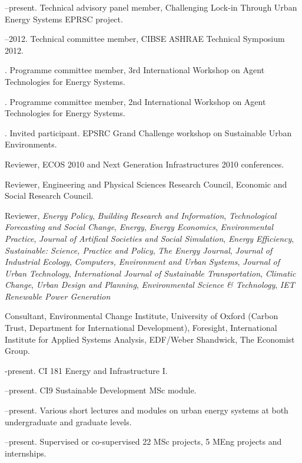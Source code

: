 \documentclass[11pt,a4paper]{article}
\begin{document}
--present. Technical advisory panel member, Challenging Lock-in Through Urban Energy Systems EPRSC project.

--2012. Technical committee member, CIBSE ASHRAE Technical Symposium 2012.

. Programme committee member, 3rd International Workshop on Agent Technologies for Energy Systems.

. Programme committee member, 2nd International Workshop on Agent Technologies for Energy Systems.

. Invited participant.  EPSRC Grand Challenge workshop on Sustainable Urban Environments.

\ind Reviewer, ECOS 2010 and Next Generation Infrastructures 2010 conferences.

\ind Reviewer, Engineering and Physical Sciences Research Council, Economic and Social Research Council.

\ind Reviewer, \emph{Energy Policy}, \emph{Building Research and Information}, \emph{Technological Forecasting and Social Change}, \emph{Energy}, \emph{Energy Economics}, \emph{Environmental Practice}, \emph{Journal of Artifical Societies and Social Simulation}, \emph{Energy Efficiency}, \emph{Sustainable: Science, Practice and Policy}, \emph{The Energy Journal}, \emph{Journal of Industrial Ecology}, \emph{Computers, Environment and Urban Systems}, \emph{Journal of Urban Technology}, \emph{International Journal of Sustainable Transportation}, \emph{Climatic Change}, \emph{Urban Design and Planning}, \emph{Environmental Science \& Technology}, \emph{IET Renewable Power Generation}

\ind Consultant, Environmental Change Institute, University of Oxford (Carbon Trust, Department for International Development), Foresight, International Institute for Applied Systems Analysis, EDF/Weber Shandwick, The Economist Group.
\bigskip

\noindent{}%
%
-present.  CI {181} Energy and Infrastructure I.

--present.  CI{9} Sustainable Development MSc module.

--present. Various short lectures and modules on urban energy systems at both undergraduate and graduate levels.
 
--present. Supervised or co-supervised 22 MSc projects, 5 MEng projects and internships.
\end{document}

